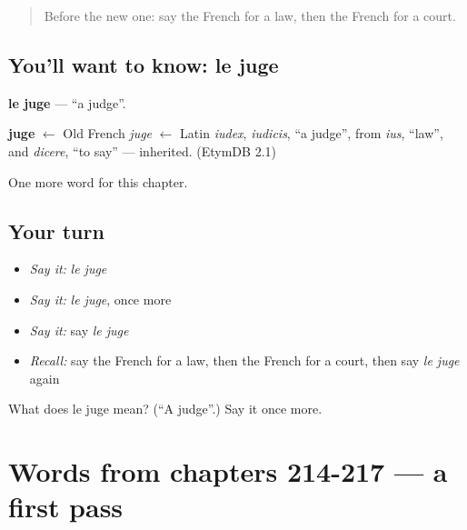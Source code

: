 \label{lesson:FR-C222-juge}



\begin{quote}
Before the new one: say the French for a law, then the French for a court.
\end{quote}

\subsection*{You'll want to know: le juge}
\textbf{le juge} — \textquotedblleft{}a judge\textquotedblright{}.

\begin{cousinweb}
\textbf{juge} $\leftarrow$ Old French \emph{juge} $\leftarrow$ Latin \emph{iudex}, \emph{iudicis}, \textquotedblleft{}a judge\textquotedblright{}, from \emph{ius}, \textquotedblleft{}law\textquotedblright{}, and \emph{dicere}, \textquotedblleft{}to say\textquotedblright{} — inherited. (EtymDB 2.1)
\end{cousinweb}

\begin{grammarlens}[title={What you've built}]
One more word for this chapter.
\end{grammarlens}

\subsection*{Your turn}
\begin{itemize}
\raggedright
  \item \emph{Say it:} \emph{le juge}
  \item \emph{Say it:} \emph{le juge}, once more
  \item \emph{Say it:} say \emph{le juge}
  \item \emph{Recall:} say the French for a law, then the French for a court, then say \emph{le juge} again
\end{itemize}

\begin{tcolorbox}[breakable,colback=teal!4,colframe=teal!35!black,title={Before you move on}]
What does le juge mean? (\textquotedblleft{}A judge\textquotedblright{}.) Say it once more.
\end{tcolorbox}
\section[(dialogue)]{Words from chapters 214-217 — a first pass}

